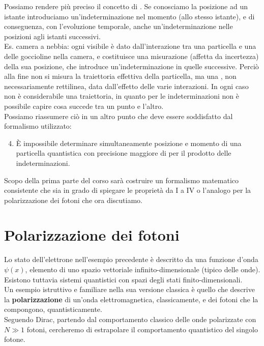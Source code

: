 \documentclass[FisicaTeorica.tex]{subfiles}
\begin{document}
Possiamo rendere più preciso il concetto di . 
Se conosciamo la posizione ad un istante introduciamo un'indeterminazione nel momento (allo stesso istante), e di conseguenza, con l'evoluzione temporale, anche un'indeterminazione nelle posizioni agli istanti successivi.\\
Es. camera a nebbia: ogni  visibile è dato dall'interazione tra una particella e una delle goccioline nella camera, e costituisce una misurazione (affetta da incertezza) della sua posizione, che introduce un'indeterminazione in quelle successive. Perciò alla fine non si misura la traiettoria effettiva della particella, ma una , non necessariamente rettilinea, data dall'effetto delle varie interazioni.
In ogni caso non è considerabile una traiettoria, in quanto per le indeterminazioni non è possibile capire cosa succede tra un punto e l'altro.\\
Possiamo riassumere ciò in un altro punto che deve essere soddisfatto dal formalismo utilizzato:
\begin{enumerate}[label=\Roman*.]
\setcounter{enumi}{3}
    \item È impossibile   determinare simultaneamente posizione e momento di una particella quantistica con precisione maggiore di  per il prodotto delle indeterminazioni. 
\end{enumerate}

Scopo della prima parte del corso sarà costruire un formalismo matematico consistente che sia in grado di spiegare le proprietà da I a IV o l'analogo per la polarizzazione dei fotoni che ora discutiamo.\\

\section{Polarizzazione dei fotoni} 
Lo stato dell'elettrone nell'esempio precedente è descritto da una funzione d'onda $\psi(x)$, elemento di uno spazio vettoriale infinito-dimensionale (tipico delle onde).\\
Esistono tuttavia sistemi quantistici con spazi degli stati finito-dimensionali.\\
Un esempio istruttivo e familiare nella sua versione classica è quello che descrive la \textbf{polarizzazione} di un'onda elettromagnetica, classicamente, e dei fotoni che la compongono, quantisticamente.\\
Seguendo Dirac, partendo dal comportamento classico delle onde polarizzate con $N\gg 1$ fotoni, cercheremo di estrapolare il comportamento quantistico del singolo fotone.\\
\end{document}
